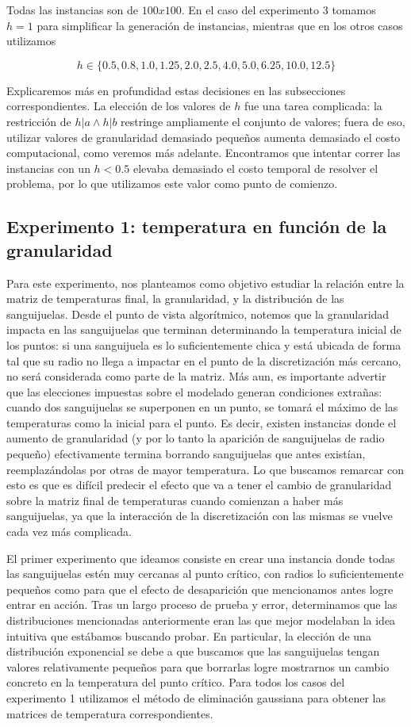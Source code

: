 Todas las instancias son de $100x100$. En el caso del experimento 3 tomamos $h = 1$ para simplificar la generación de instancias, mientras que en los otros casos utilizamos

$$h \in \{0.5, 0.8, 1.0, 1.25, 2.0, 2.5, 4.0, 5.0, 6.25, 10.0, 12.5\}$$

Explicaremos más en profundidad estas decisiones en las subsecciones correspondientes. La elección de los valores de $h$ fue una tarea complicada: la restricción de $h | a \wedge h | b$ restringe ampliamente el conjunto de valores; fuera de eso, utilizar valores de granularidad demasiado pequeños aumenta demasiado el costo computacional, como veremos más adelante. Encontramos que intentar correr las instancias con un $h < 0.5$ elevaba demasiado el costo temporal de resolver el problema, por lo que utilizamos este valor como punto de comienzo.

\subsection{Experimento 1: temperatura en función de la granularidad}

Para este experimento, nos planteamos como objetivo estudiar la relación entre la matriz de temperaturas final, la granularidad, y la distribución de las sanguijuelas. Desde el punto de vista algorítmico, notemos que la granularidad impacta en las sanguijuelas que terminan determinando la temperatura inicial de los puntos: si una sanguijuela es lo suficientemente chica y está ubicada de forma tal que su radio no llega a impactar en el punto de la discretización más cercano, no será considerada como parte de la matriz. Más aun, es importante advertir que las elecciones impuestas sobre el modelado generan condiciones extrañas: cuando dos sanguijuelas se superponen en un punto, se tomará el máximo de las temperaturas como la inicial para el punto. Es decir, existen instancias donde el aumento de granularidad (y por lo tanto la aparición de sanguijuelas de radio pequeño) efectivamente termina borrando sanguijuelas que antes existían, reemplazándolas por otras de mayor temperatura. Lo que buscamos remarcar con esto es que es difícil predecir el efecto que va a tener el cambio de granularidad sobre la matriz final de temperaturas cuando comienzan a haber más sanguijuelas, ya que la interacción de la discretización con las mismas se vuelve cada vez más complicada.

El primer experimento que ideamos consiste en crear una instancia donde todas las sanguijuelas estén muy cercanas al punto crítico, con radios lo suficientemente pequeños como para que el efecto de desaparición que mencionamos antes logre entrar en acción. Tras un largo proceso de prueba y error, determinamos que las distribuciones mencionadas anteriormente eran las que mejor modelaban la idea intuitiva que estábamos buscando probar. En particular, la elección de una distribución exponencial se debe a que buscamos que las sanguijuelas tengan valores relativamente pequeños para que borrarlas logre mostrarnos un cambio concreto en la temperatura del punto crítico. Para todos los casos del experimento 1 utilizamos el método de eliminación gaussiana para obtener las matrices de temperatura correspondientes.

